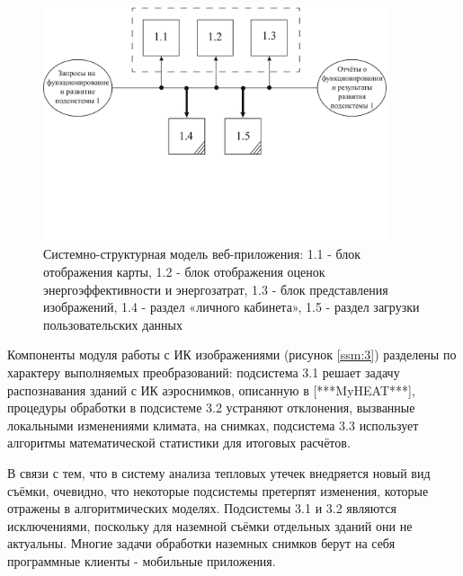 \pagebreak

	\begin{figure}[t!]
      \centering
      \includegraphics[width=0.9\textwidth]{images/ssm/1}
      \caption{Системно-структурная модель веб-приложения: 1.1 - блок отображения карты, 1.2 - блок отображения оценок энергоэффективности и энергозатрат, 1.3 - блок представления изображений, 1.4 - раздел «личного кабинета», 1.5 - раздел загрузки пользовательских данных}
      \label{ssm:1}
    \end{figure}

\par
	Компоненты модуля работы с ИК изображениями (рисунок \ref{ssm:3}) разделены по характеру выполняемых преобразований: подсистема 3.1 решает задачу распознавания зданий с ИК аэроснимков, описанную в [***MyHEAT***], процедуры обработки в подсистеме 3.2 устраняют отклонения, вызванные локальными изменениями климата, на снимках, подсистема 3.3 использует алгоритмы математической статистики для итоговых расчётов.

\pagebreak

	В связи с тем, что в систему анализа тепловых утечек внедряется новый вид съёмки, очевидно, что некоторые подсистемы претерпят изменения, которые отражены в алгоритмических моделях. Подсистемы 3.1 и 3.2 являются исключениями, поскольку для наземной съёмки отдельных зданий они не актуальны. Многие задачи обработки наземных снимков берут на себя программные клиенты - мобильные приложения.

